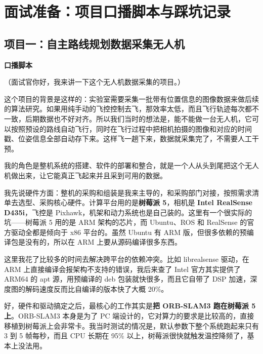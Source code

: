 \documentclass[11pt,a4paper]{article}
\begin{document}
\section*{面试准备：项目口播脚本与踩坑记录}

\subsection*{项目一：自主路线规划数据采集无人机}

\textbf{口播脚本}

（面试官你好，我来讲一下这个无人机数据采集的项目。）

这个项目的背景是这样的：实验室需要采集一批带有位置信息的图像数据来做后续的算法研究。如果用纯手动的飞控控制去飞，那效率太低，而且飞行轨迹每次都不一致，后期数据也不好对齐。所以我们当时的想法是，能不能做一台无人机，它可以按照预设的路线自动飞行，同时在飞行过程中把相机拍摄的图像和对应的时间戳、位姿信息全部自动存下来。这样飞一趟下来，数据就采集完了，不需要人工干预。

我的角色是整机系统的搭建、软件的部署和整合，就是一个人从头到尾把这个无人机做出来，让它能真正飞起来并且采到可用的数据。

我先说硬件方面：整机的采购和组装是我来主导的，和采购部门对接，按照需求清单去选型、采购核心硬件。计算平台用的是\textbf{树莓派 5}，相机是 \textbf{Intel RealSense D435i}，飞控是 Pixhawk，机架和动力系统也是自己装的。这里有一个很实际的坑——树莓派 5 用的是 ARM 架构的芯片，而 Ubuntu、ROS 和 RealSense 的官方驱动全都是倾向于 x86 平台的。虽然 Ubuntu 有 ARM 版，但很多依赖的预编译包是没有的，所以在 ARM 上要从源码编译很多东西。

这里我花了比较多的时间去解决跨平台的依赖冲突。比如 librealsense 驱动，在 ARM 上直接编译会报架构不支持的错误，我后来查了 Intel 官方其实提供了 ARM64 的 apt 源，用预编译的 deb 包装就快很多，而且它自带了 DSP 加速，深度图的解码速度反而比自编译的版本快了大概 20\%。

好，硬件和驱动搞定之后，最核心的工作其实是\textbf{把 ORB-SLAM3 跑在树莓派 5 上}。ORB-SLAM3 本身是为了 PC 端设计的，它对算力的要求是比较高的，直接移植到树莓派上会非常卡。我当时测试的情况是，默认参数下整个系统跑起来只有 3 到 5 帧每秒，而且 CPU 长期在 95\% 以上，树莓派很快就触发温控降频了，基本上没法用。
\end{document}
